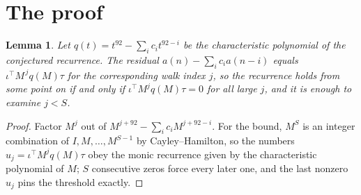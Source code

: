 \documentclass[11pt,a4paper]{article}
\theoremstyle{plain}
\newtheorem{lemma}[theorem]{Lemma}
\theoremstyle{definition}
\begin{document}
\section{The proof}

\begin{lemma}\label{lem:crit}
Let $q(t)=t^{92}-\sum_i c_it^{92-i}$ be the characteristic polynomial of the
conjectured recurrence. The residual $a(n)-\sum_ic_ia(n-i)$ equals
$\iota^{\!\top}M^{\,j}q(M)\tau$ for the corresponding walk index $j$, so the recurrence
holds from some point on if and only if $\iota^{\!\top}M^{j}q(M)\tau=0$ for all large $j$,
and it is enough to examine $j<S$.
\end{lemma}

\begin{proof}
Factor $M^{j}$ out of $M^{j+92}-\sum_ic_iM^{j+92-i}$. For the bound, $M^{S}$
is an integer combination of $I,M,\dots,M^{S-1}$ by Cayley--Hamilton, so the numbers
$u_j=\iota^{\!\top}M^{j}q(M)\tau$ obey the monic recurrence given by the characteristic
polynomial of $M$; $S$ consecutive zeros force every later one, and the last nonzero $u_j$
pins the threshold exactly.
\end{proof}
\end{document}
